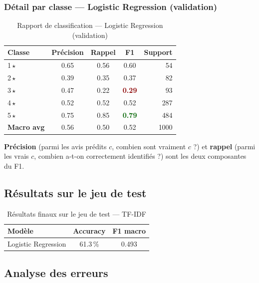 \documentclass[12pt, a4paper]{article}
\begin{document}
\subsubsection{Détail par classe — Logistic Regression (validation)}

\begin{table}[H]
  \centering
  \begin{tabular}{lcccr}
    \toprule
    \textbf{Classe} & \textbf{Précision} & \textbf{Rappel} & \textbf{F1} & \textbf{Support} \\
    \midrule
    1\,$\star$ & 0.65 & 0.56 & 0.60 &  54 \\
    2\,$\star$ & 0.39 & 0.35 & 0.37 &  82 \\
    3\,$\star$ & 0.47 & 0.22 & \textcolor{darkred}{\textbf{0.29}} &  93 \\
    4\,$\star$ & 0.52 & 0.52 & 0.52 & 287 \\
    5\,$\star$ & 0.75 & 0.85 & \textcolor{darkgreen}{\textbf{0.79}} & 484 \\
    \midrule
    \textbf{Macro avg} & 0.56 & 0.50 & 0.52 & 1000 \\
    \bottomrule
  \end{tabular}
  \caption{Rapport de classification — Logistic Regression (validation)}
\end{table}

\textbf{Précision} (parmi les avis prédits $c$, combien sont vraiment $c$ ?) et
\textbf{rappel} (parmi les vrais $c$, combien a-t-on correctement identifiés ?) sont
les deux composantes du F1.

\subsection{Résultats sur le jeu de test}

\begin{table}[H]
  \centering
  \begin{tabular}{lcc}
    \toprule
    \textbf{Modèle} & \textbf{Accuracy} & \textbf{F1 macro} \\
    \midrule
    Logistic Regression & 61.3\,\% & 0.493 \\
    \bottomrule
  \end{tabular}
  \caption{Résultats finaux sur le jeu de test — TF-IDF}
\end{table}

\subsection{Analyse des erreurs}
\end{document}
